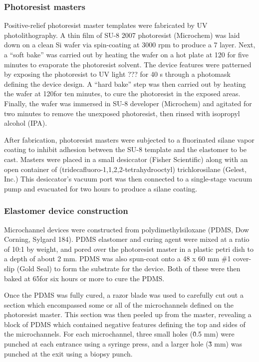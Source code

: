\subsubsection{Photoresist masters}
Positive-relief photoresist master templates were fabricated by UV photolithography. A thin film
of SU-8 2007 photoresist (Microchem) was laid down on a clean Si wafer via spin-coating at 3000 rpm to produce a 
7 \microns layer. Next, a ``soft bake'' was carried out by heating the wafer on a hot plate at 120\degC
for five minutes to evaporate the photoresist solvent.  The device features were patterned by exposing the 
photoresist to UV light ??? for 40 s through a photomask defining the device design. A ``hard bake'' step
was then carried out by heating the wafer at 120\degC for ten minutes, to cure the photoresist in the exposed areas.
Finally, the wafer was immersed in SU-8 developer (Microchem) and agitated for two minutes to remove the unexposed
photoresist, then rinsed with isopropyl alcohol (IPA).

After fabrication, photoresist masters were subjected to a fluorinated silane vapor coating to inhibit adhesion
between the SU-8 template and the elastomer to be cast. Masters were placed in a small desiccator (Fisher Scientific)
along with an open container of (tridecafluoro-1,1,2,2-tetrahydrooctyl) trichlorosilane (Gelest, Inc.)
This desiccator's vacuum port was then connected to a single-stage vacuum pump and evacuated for two hours to produce
a silane coating.

\subsubsection{Elastomer device construction}

Microchannel devices were constructed from polydimethylsiloxane (PDMS, Dow Corning, Sylgard 184). PDMS
elastomer and curing agent were mixed at a ratio of 10:1 by weight, and pored over the photoresist master 
in a plastic petri dish to a depth of about 2 mm.  PDMS was also spun-coat onto a 48 x 60 mm \#1 cover-slip (Gold Seal)
to form the substrate for the device.
Both of these  were then baked at 65\degC for six hours or more to cure
the PDMS.  

Once the PDMS was fully cured, a razor blade was used to carefully cut out a section which encompassed some or all of
the microchannels defined on the photoresist master. This section was then peeled up from the master, revealing
a block of PDMS which contained negative features defining the top and sides of the microchannels.
For each microchannel, three small holes (\~ 0.5 mm) were punched at each entrance using a syringe press, and a larger
hole (\~ 3 mm) was punched at the exit using a biopsy punch.

